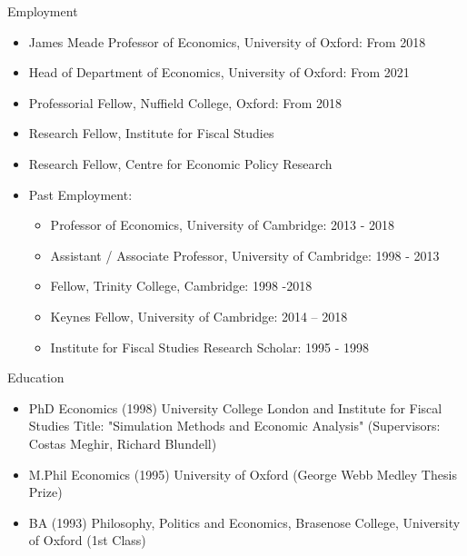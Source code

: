 \documentclass{resume} %
\begin{document}
\begin{rSection}{Employment}
\begin{itemize}
    \item James Meade Professor of Economics, University of Oxford: From 2018 
    \item Head of Department of Economics, University of Oxford: From 2021
    \item Professorial Fellow, Nuffield College, Oxford: From 2018
    \item Research Fellow, Institute for Fiscal Studies
    \item Research Fellow, Centre for Economic Policy Research
\item Past Employment:
\begin{itemize}
    \item Professor of Economics, University of Cambridge: 2013 - 2018
     \item Assistant / Associate Professor, University of Cambridge: 1998 - 2013
    \item Fellow, Trinity College, Cambridge: 1998 -2018
    \item Keynes Fellow, University of Cambridge: 2014 – 2018
    \item Institute for Fiscal Studies Research Scholar: 1995 - 1998
\end{itemize}
\end{itemize}

\end{rSection}
\vspace{0.5cm}
\begin{rSection}{Education}
\begin{itemize}	
\item PhD Economics (1998) University College London and Institute for Fiscal Studies
Title: "Simulation Methods and Economic Analysis" (Supervisors: Costas Meghir, Richard Blundell)
\item M.Phil Economics (1995) University of Oxford (George Webb Medley Thesis Prize)
\item BA (1993) Philosophy, Politics and Economics, Brasenose College, University of Oxford (1st Class) 
\end{itemize}
\\

\end{rSection}
\end{document}
